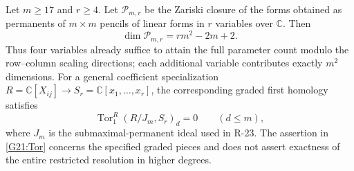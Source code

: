 \begin{theorem}
\label{G-21}
Let $m\ge17$ and $r\ge4$. Let $\mathcal P_{m,r}$ be the
Zariski closure of the forms obtained as permanents of
$m\times m$ pencils of linear forms in $r$ variables over
$\mathbb C$. Then
\begin{equation}\label{G21:dimension}
 \dim\mathcal P_{m,r}=rm^2-2m+2.
\end{equation}
Thus four variables already suffice to attain the full
parameter count modulo the row--column scaling directions;
each additional variable contributes exactly $m^2$ dimensions.
For a general coefficient specialization
$R=\mathbb C[X_{ij}]\longrightarrow S_r=\mathbb C[x_1,\ldots,x_r]$,
the corresponding graded first homology satisfies
\begin{equation}\label{G21:Tor}
 \operatorname{Tor}_1^R(R/J_m,S_r)_d=0
 \qquad(d\le m),
\end{equation}
where $J_m$ is the submaximal-permanent ideal used in R-23.
The assertion in \eqref{G21:Tor} concerns the specified graded
pieces and does not assert exactness of the entire restricted
resolution in higher degrees.
\end{theorem}

